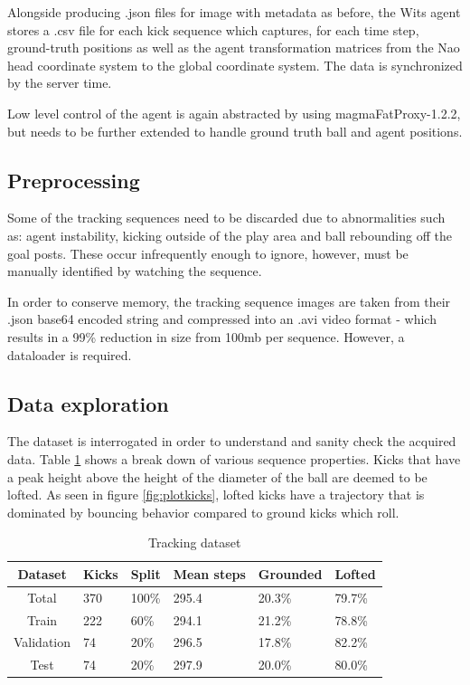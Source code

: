 \documentclass[a4paper,twoside,12pt]{report}
\begin{document}
Alongside producing .json files for image with metadata as before, the Wits agent stores a .csv file for each kick sequence which captures, for each time step, ground-truth positions as well as the agent transformation matrices from the Nao head coordinate system to the global coordinate system. The data is synchronized by the server time. 

Low level control of the agent is again abstracted by using magmaFatProxy-1.2.2, but needs to be further extended to handle ground truth ball and agent positions. 

\subsection{Preprocessing}

Some of the tracking sequences need to be discarded due to abnormalities such as: agent instability, kicking outside of the play area and ball rebounding off the goal posts. These occur infrequently enough to ignore, however, must be manually identified by watching the sequence. 

In order to conserve memory, the tracking sequence images are taken from their .json base64 encoded string and compressed into an .avi video format - which results in a 99\% reduction in size from 100mb per sequence. However, a dataloader is required.

\subsection{Data exploration}

The dataset is interrogated in order to understand and sanity check the acquired data. Table \ref{tab:tracking} shows a break down of various sequence properties. Kicks that have a peak height above the height of the diameter of the ball are deemed to be lofted. As seen in figure \ref{fig:plotkicks}, lofted kicks have a trajectory that is dominated by bouncing behavior compared to ground kicks which roll.

\begin{table}[h!]
\fontsize{9.5pt}{12pt}\selectfont
\centering
\begin{tabular}{c|ll|l|ll}
{\bf Dataset}	&{\bf Kicks}	&{\bf Split}	&{\bf Mean steps}	&{\bf Grounded}	&{\bf Lofted}	\\\hline
Total			&370			&100\%			&295.4			&20.3\%			&79.7\%			\\\hline   
Train			&222			&60\%			&294.1			&21.2\%			&78.8\%			\\\hline  
Validation		&74				&20\%			&296.5			&17.8\%			&82.2\%			\\\hline  
Test			&74				&20\%			&297.9			&20.0\%			&80.0\%			\\\hline                        
\end{tabular}
\caption{Tracking dataset}
\label{tab:tracking}
\end{table}
\end{document}
